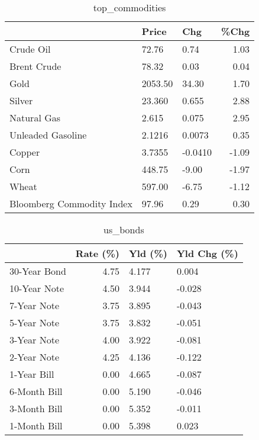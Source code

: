 \documentclass{article}%
\begin{document}
\begin{table}[htbp]%
\caption{top\_commodities}%
\centering%
\begin{adjustbox}{width=1\textwidth}%
\begin{tabular}{lllr}
\toprule
                          &   Price &     Chg &  \%Chg \\
\midrule
               Crude Oil  &   72.76 &    0.74 &  1.03 \\
             Brent Crude  &   78.32 &    0.03 &  0.04 \\
                    Gold  & 2053.50 &   34.30 &  1.70 \\
                  Silver  &  23.360 &   0.655 &  2.88 \\
             Natural Gas  &   2.615 &   0.075 &  2.95 \\
       Unleaded Gasoline  &  2.1216 &  0.0073 &  0.35 \\
                  Copper  &  3.7355 & -0.0410 & -1.09 \\
                    Corn  &  448.75 &   -9.00 & -1.97 \\
                   Wheat  &  597.00 &   -6.75 & -1.12 \\
Bloomberg Commodity Index &   97.96 &    0.29 &  0.30 \\
\bottomrule
\end{tabular}
%
\end{adjustbox}%
\end{table}

%


\begin{table}[htbp]%
\caption{us\_bonds}%
\centering%
\begin{adjustbox}{width=1\textwidth}%
\begin{tabular}{lrll}
\toprule
             &  Rate (\%) & Yld (\%) & Yld Chg (\%) \\
\midrule
30-Year Bond &      4.75 &   4.177 &       0.004 \\
10-Year Note &      4.50 &   3.944 &      -0.028 \\
 7-Year Note &      3.75 &   3.895 &      -0.043 \\
 5-Year Note &      3.75 &   3.832 &      -0.051 \\
 3-Year Note &      4.00 &   3.922 &      -0.081 \\
 2-Year Note &      4.25 &   4.136 &      -0.122 \\
 1-Year Bill &      0.00 &   4.665 &      -0.087 \\
6-Month Bill &      0.00 &   5.190 &      -0.046 \\
3-Month Bill &      0.00 &   5.352 &      -0.011 \\
1-Month Bill &      0.00 &   5.398 &       0.023 \\
\bottomrule
\end{tabular}
%
\end{adjustbox}%
\end{table}
\end{document}
